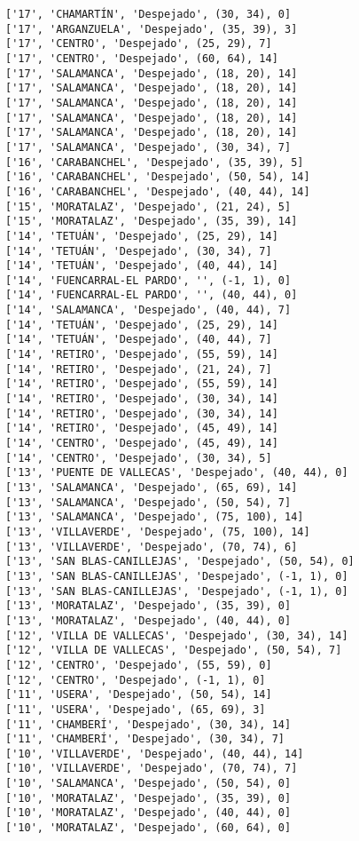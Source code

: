 \documentclass[11pt]{article}
\begin{document}
\begin{Verbatim}[commandchars=\\\{\}]
['17', 'CHAMARTÍN', 'Despejado', (30, 34), 0]
['17', 'ARGANZUELA', 'Despejado', (35, 39), 3]
['17', 'CENTRO', 'Despejado', (25, 29), 7]
['17', 'CENTRO', 'Despejado', (60, 64), 14]
['17', 'SALAMANCA', 'Despejado', (18, 20), 14]
['17', 'SALAMANCA', 'Despejado', (18, 20), 14]
['17', 'SALAMANCA', 'Despejado', (18, 20), 14]
['17', 'SALAMANCA', 'Despejado', (18, 20), 14]
['17', 'SALAMANCA', 'Despejado', (18, 20), 14]
['17', 'SALAMANCA', 'Despejado', (30, 34), 7]
['16', 'CARABANCHEL', 'Despejado', (35, 39), 5]
['16', 'CARABANCHEL', 'Despejado', (50, 54), 14]
['16', 'CARABANCHEL', 'Despejado', (40, 44), 14]
['15', 'MORATALAZ', 'Despejado', (21, 24), 5]
['15', 'MORATALAZ', 'Despejado', (35, 39), 14]
['14', 'TETUÁN', 'Despejado', (25, 29), 14]
['14', 'TETUÁN', 'Despejado', (30, 34), 7]
['14', 'TETUÁN', 'Despejado', (40, 44), 14]
['14', 'FUENCARRAL-EL PARDO', '', (-1, 1), 0]
['14', 'FUENCARRAL-EL PARDO', '', (40, 44), 0]
['14', 'SALAMANCA', 'Despejado', (40, 44), 7]
['14', 'TETUÁN', 'Despejado', (25, 29), 14]
['14', 'TETUÁN', 'Despejado', (40, 44), 7]
['14', 'RETIRO', 'Despejado', (55, 59), 14]
['14', 'RETIRO', 'Despejado', (21, 24), 7]
['14', 'RETIRO', 'Despejado', (55, 59), 14]
['14', 'RETIRO', 'Despejado', (30, 34), 14]
['14', 'RETIRO', 'Despejado', (30, 34), 14]
['14', 'RETIRO', 'Despejado', (45, 49), 14]
['14', 'CENTRO', 'Despejado', (45, 49), 14]
['14', 'CENTRO', 'Despejado', (30, 34), 5]
['13', 'PUENTE DE VALLECAS', 'Despejado', (40, 44), 0]
['13', 'SALAMANCA', 'Despejado', (65, 69), 14]
['13', 'SALAMANCA', 'Despejado', (50, 54), 7]
['13', 'SALAMANCA', 'Despejado', (75, 100), 14]
['13', 'VILLAVERDE', 'Despejado', (75, 100), 14]
['13', 'VILLAVERDE', 'Despejado', (70, 74), 6]
['13', 'SAN BLAS-CANILLEJAS', 'Despejado', (50, 54), 0]
['13', 'SAN BLAS-CANILLEJAS', 'Despejado', (-1, 1), 0]
['13', 'SAN BLAS-CANILLEJAS', 'Despejado', (-1, 1), 0]
['13', 'MORATALAZ', 'Despejado', (35, 39), 0]
['13', 'MORATALAZ', 'Despejado', (40, 44), 0]
['12', 'VILLA DE VALLECAS', 'Despejado', (30, 34), 14]
['12', 'VILLA DE VALLECAS', 'Despejado', (50, 54), 7]
['12', 'CENTRO', 'Despejado', (55, 59), 0]
['12', 'CENTRO', 'Despejado', (-1, 1), 0]
['11', 'USERA', 'Despejado', (50, 54), 14]
['11', 'USERA', 'Despejado', (65, 69), 3]
['11', 'CHAMBERÍ', 'Despejado', (30, 34), 14]
['11', 'CHAMBERÍ', 'Despejado', (30, 34), 7]
['10', 'VILLAVERDE', 'Despejado', (40, 44), 14]
['10', 'VILLAVERDE', 'Despejado', (70, 74), 7]
['10', 'SALAMANCA', 'Despejado', (50, 54), 0]
['10', 'MORATALAZ', 'Despejado', (35, 39), 0]
['10', 'MORATALAZ', 'Despejado', (40, 44), 0]
['10', 'MORATALAZ', 'Despejado', (60, 64), 0]

\end{Verbatim}
\end{document}
